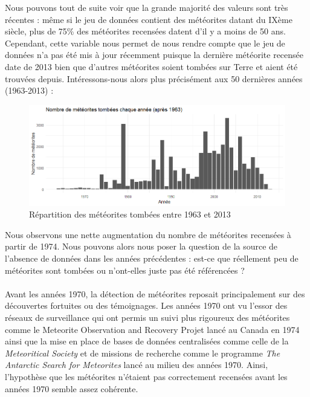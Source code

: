 \documentclass[12pt]{article}
\begin{document}
Nous pouvons tout de suite voir que la grande majorité des valeurs sont très récentes : même si le jeu de données contient des météorites datant du IXème siècle, plus de 75\% des météorites recensées datent d'il y a moins de 50 ans. Cependant, cette variable nous permet de nous rendre compte que le jeu de données n'a pas été mis à jour récemment puisque la dernière météorite recensée date de 2013 bien que d'autres météorites soient tombées sur Terre et aient été trouvées depuis. Intéressons-nous alors plus précisément aux 50 dernières années (1963-2013) :\\
\begin{figure}[H]
\centering
\includegraphics[width=16cm]{Images/exploration/histogramme1963-2013.png}
\caption{Répartition des météorites tombées entre 1963 et 2013}
\end{figure}
Nous observons une nette augmentation du nombre de météorites recensées à partir de 1974. Nous pouvons alors nous poser la question de la source de l'absence de données dans les années précédentes : est-ce que réellement peu de météorites sont tombées ou n'ont-elles juste pas été référencées ?\\
\\
Avant les années 1970, la détection de météorites reposait principalement sur des découvertes fortuites ou des témoignages. Les années 1970 ont vu l'essor des réseaux de surveillance qui ont permis un suivi plus rigoureux des météorites comme le Meteorite Observation and Recovery Projet \cite{Article_Canada_1970} lancé au Canada en 1974 ainsi que la mise en place de bases de données centralisées comme celle de la \textit{Meteoritical Society} \cite{BDD_centralisees} et de missions de recherche comme le programme \textit{The Antarctic Search for Meteorites} \cite{Mission_recherche_antartictique} lancé au milieu des années 1970. Ainsi, l'hypothèse que les météorites n'étaient pas correctement recensées avant les années 1970 semble assez cohérente.
\end{document}
